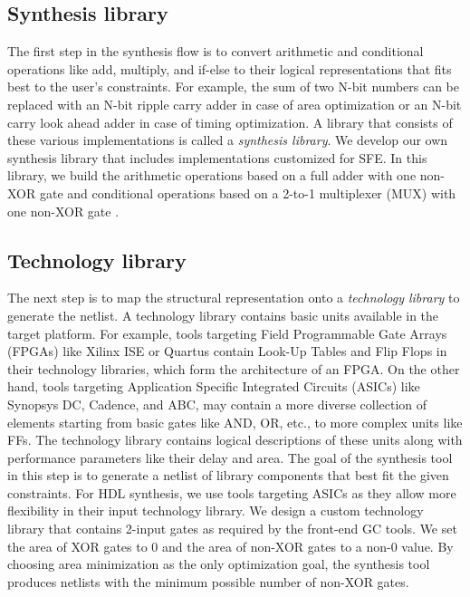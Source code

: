 \subsection{Synthesis library}
The first step in the synthesis flow is to convert arithmetic and conditional operations like add, multiply, and if-else to their logical representations that fits best to the user's constraints.
For example, the sum of two N-bit numbers can be replaced with an N-bit ripple carry adder in case of area optimization or an N-bit carry look ahead adder in case of timing optimization.
A library that consists of these various implementations is called a \emph{synthesis library}.
We develop our own synthesis library that includes implementations customized for SFE.
In this library, we build the arithmetic operations based on a full adder with one non-XOR gate \cite{boyar2006concrete} and conditional operations based on a 2-to-1 multiplexer (MUX) with one non-XOR gate \cite{kolesnikov2008improved}.

\subsection{Technology library}
The next step is to map the structural representation onto a \emph{technology library} to generate the netlist.
A technology library contains basic units available in the target platform.
For example, tools targeting Field Programmable Gate Arrays (FPGAs) like Xilinx ISE or Quartus contain Look-Up Tables and Flip Flops in their technology libraries, which form the architecture of an FPGA.
On the other hand, tools targeting Application Specific Integrated Circuits (ASICs) like Synopsys DC, Cadence, and ABC, may contain a more diverse collection of elements starting from basic gates like AND, OR, etc., to more complex units like FFs.
The technology library contains logical descriptions of these units along with performance parameters like their delay and area.
The goal of the synthesis tool in this step is to generate a netlist of library components that best fit the given constraints.
For HDL synthesis, we use tools targeting ASICs as they allow more flexibility in their input technology library.
We design a custom technology library that contains 2-input gates as required by the front-end GC tools.
We set the area of XOR gates to 0 and the area of non-XOR gates to a non-0 value.
By choosing area minimization as the only optimization goal, the synthesis tool produces netlists with the minimum possible number of non-XOR gates.

